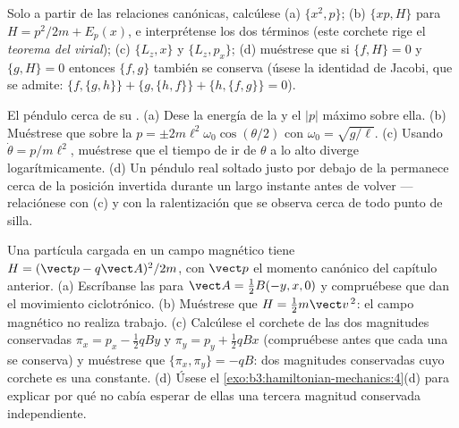 \begin{exercise}[$\star$]\label{exo:b3:hamiltonian-mechanics:4}
Solo a partir de las relaciones canónicas, calcúlese (a) $\{x^2, p\}$; (b)
$\{xp, H\}$ para $H = p^2/2m + E_p(x)$, e interprétense los dos términos
(este corchete rige el \emph{teorema del virial}); (c) $\{L_z, x\}$ y
$\{L_z, p_x\}$; (d) muéstrese que si $\{f, H\} = 0$ y $\{g, H\} = 0$
entonces $\{f, g\}$ también se conserva (úsese la identidad de Jacobi, que se
admite: $\{f,\{g,h\}\} + \{g,\{h,f\}\} + \{h,\{f,g\}\} = 0$).
\end{exercise}

\begin{exercise}[$\star\star$]\label{exo:b3:hamiltonian-mechanics:5}
El péndulo cerca de su . (a) Dese la energía de la  y el
$|p|$ máximo sobre ella. (b) Muéstrese que sobre la  $p =
\pm 2m\ell^2\omega_0\cos(\theta/2)$ con $\omega_0 = \sqrt{g/\ell}$.
(c) Usando $\dot\theta = p/m\ell^2$, muéstrese que el tiempo de ir de
$\theta$ a lo alto diverge logarítmicamente. (d) Un péndulo real soltado
justo por debajo de la  permanece cerca de la posición invertida
durante un largo instante antes de volver --- relaciónese con (c) y con la
ralentización que se observa cerca de todo punto de silla.
\end{exercise}

\begin{exercise}[$\star\star$]\label{exo:b3:hamiltonian-mechanics:6}
Una partícula cargada en un campo magnético tiene $H = (\vect p -
q\vect A)^2/2m$, con $\vect p$ el momento canónico del capítulo
anterior. (a) Escríbanse las  para $\vect A = \tfrac12
B(-y, x, 0)$ y compruébese que dan el movimiento ciclotrónico. (b) Muéstrese
que $H =
\tfrac12 m\vect v^{\,2}$: el campo magnético no realiza trabajo. (c) Calcúlese
el corchete de las dos magnitudes conservadas $\pi_x = p_x - \tfrac12
qBy$ y $\pi_y = p_y + \tfrac12 qBx$ (compruébese antes que cada una se
conserva) y muéstrese que $\{\pi_x, \pi_y\} = -qB$: dos magnitudes
conservadas cuyo corchete es una constante. (d) Úsese el
\cref{exo:b3:hamiltonian-mechanics:4}(d) para explicar por qué no cabía
esperar de ellas una tercera magnitud conservada independiente.
\end{exercise}

